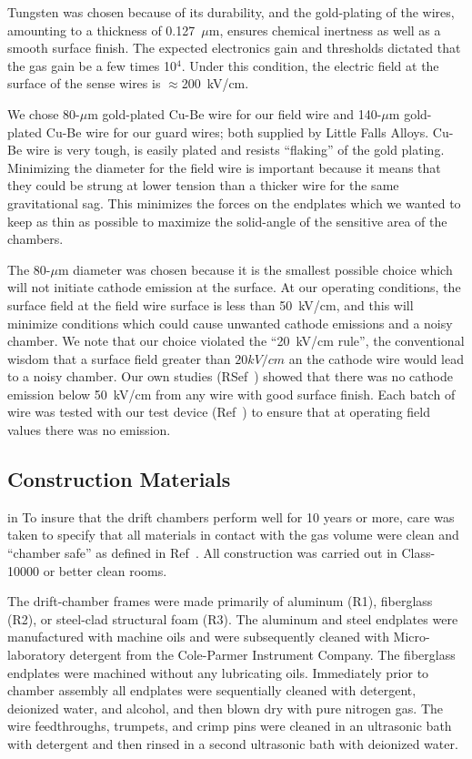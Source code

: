 Tungsten was chosen because of its durability, 
and the gold-plating of the wires, amounting to a thickness of 0.127~$\mu$m, 
ensures chemical inertness as well as a smooth surface finish.  The expected 
electronics gain and thresholds dictated that the gas gain be a few times 
10$^4$.  Under this condition, the electric field at the surface of the sense 
wires is $\approx$200~kV/cm.  

We chose 80-$\mu$m gold-plated Cu-Be wire for our field wire and
140-$\mu$m gold-plated Cu-Be wire for our guard wires; both supplied
by Little Falls Alloys.
Cu-Be wire is very tough, is easily plated and resists ``flaking'' of the gold
plating. 
Minimizing the diameter for the field wire is important because it means that they 
could be strung at lower tension than a thicker wire for the same gravitational sag.  
This minimizes the forces on the endplates which we wanted to keep as 
thin as possible to maximize the solid-angle of the sensitive area of
the chambers.

The 80-$\mu$m diameter was chosen because it is the smallest possible choice
which will not initiate cathode emission at the surface.
At our operating conditions, the surface field at the field wire
surface is less than 50~kV/cm, and this will minimize 
conditions which could cause unwanted cathode emissions and a noisy chamber.  
We note that
our choice violated the ``20~kV/cm rule'', the conventional wisdom that
a surface field greater than $20 kV/cm$ an the cathode wire would lead to 
a noisy chamber.
Our own studies (RSef~\cite{cathode-emission}) showed that there was no cathode
emission below 50~kV/cm from any wire with good surface finish.  Each batch
of wire was tested with our test device (Ref~\cite{patent}) to ensure that at operating field 
values there was no emission.  

\subsection{Construction Materials}

 in
To insure that the drift chambers perform well for 10 years or more, care was taken to 
specify that all materials in contact with the gas volume were clean and ``chamber 
safe'' as defined in Ref~\cite{kadyk}.  All construction was carried out in 
Class-10000 or better clean rooms.

The drift-chamber frames were made primarily of aluminum (R1), fiberglass (R2),
or steel-clad structural foam (R3).  The aluminum and steel endplates were 
manufactured with machine oils and were subsequently cleaned with  
Micro-laboratory detergent from the Cole-Parmer Instrument Company.  The 
fiberglass endplates were machined without any lubricating oils.  Immediately 
prior to chamber assembly all endplates were sequentially cleaned with 
detergent,
 deionized water, and alcohol, and then blown dry with pure nitrogen gas.  The 
wire feedthroughs, trumpets, and crimp pins were cleaned in an ultrasonic bath 
with detergent and then rinsed in a second ultrasonic bath with deionized water.

